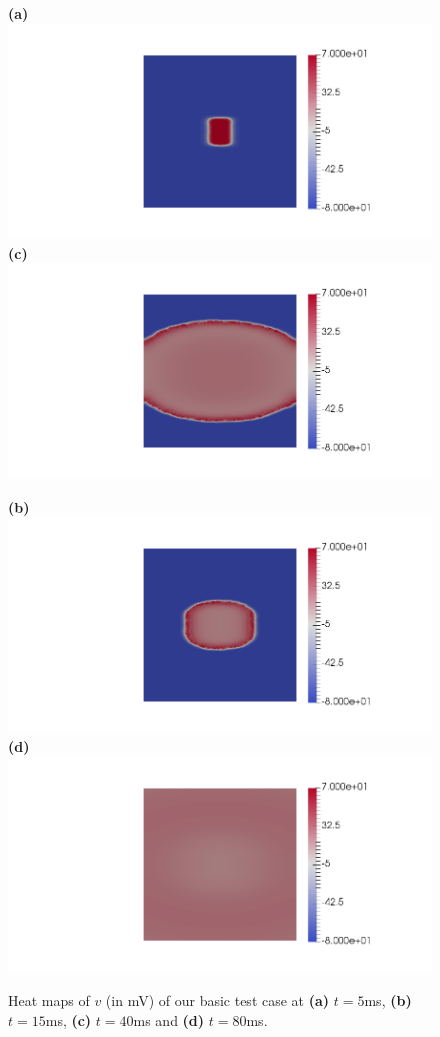 \documentclass[12pt,a4paper]{article}
\begin{document}
\begin{figure}

\begin{minipage}{0.47\textwidth}
 \textbf{(a)} \includegraphics[trim=9cm 0cm 2cm 0cm, clip=true, width=0.9\linewidth]{v5}
      \textbf{(c)} \includegraphics[trim=9cm 0cm 2cm 0cm, clip=true, width=0.9\linewidth]{v40}
    \end{minipage}
    \begin{minipage}{0.47\textwidth}
  \textbf{(b)} \includegraphics[trim=9cm 0cm 2cm 0cm, clip=true, width=0.9\linewidth]{v15}
  \textbf{(d)} \includegraphics[trim=9cm 0cm 2cm 0cm, clip=true, width=0.9\linewidth]{v90}
    \end{minipage}
    \caption{Heat maps of $v$ (in mV) of our basic test case at \textbf{(a)} $t=5$ms, \textbf{(b)} $t=15$ms, \textbf{(c)} $t=40$ms and \textbf{(d)} $t=80$ms.}
    \label{fig:1}
\end{figure}
\end{document}
